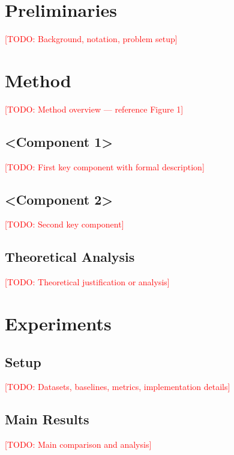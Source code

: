 \documentclass{article}
\newcommand{\todo}[1]{\textcolor{red}{[TODO: #1]}}
\begin{document}
\section{Preliminaries}
\label{sec:prelim}

\todo{Background, notation, problem setup}

\section{Method}
\label{sec:method}

\todo{Method overview — reference Figure 1}

\subsection{<Component 1>}
\label{sec:component1}
\todo{First key component with formal description}

\subsection{<Component 2>}
\label{sec:component2}
\todo{Second key component}

\subsection{Theoretical Analysis}
\label{sec:theory}
\todo{Theoretical justification or analysis}

\section{Experiments}
\label{sec:experiments}

\subsection{Setup}
\label{sec:setup}
\todo{Datasets, baselines, metrics, implementation details}

\subsection{Main Results}
\label{sec:main_results}
\todo{Main comparison and analysis}
\end{document}
